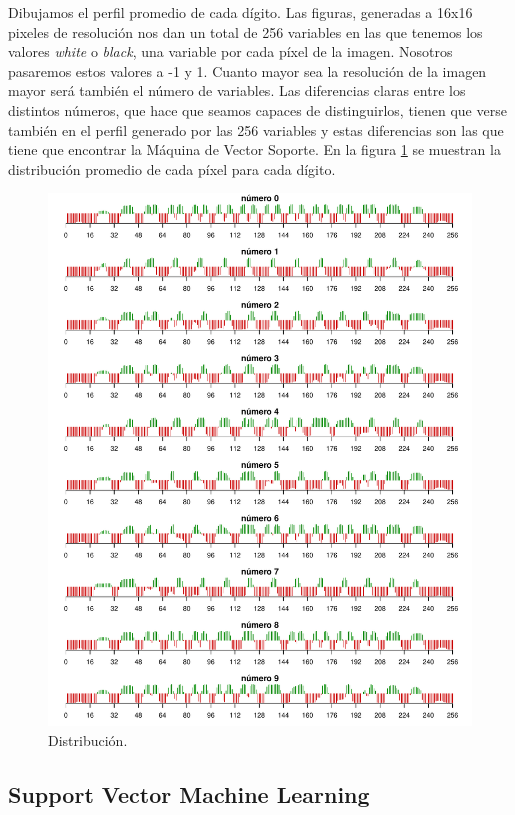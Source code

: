 \documentclass[12pt,spanish,a4paper]{article}
\numberwithin{equation}{section}
\begin{document}
Dibujamos el perfil promedio de cada dígito. Las figuras, generadas a
16x16 pixeles de resolución nos dan un total de 256 variables en las que
tenemos los valores \emph{white} o \emph{black}, una variable por cada
píxel de la imagen. Nosotros pasaremos estos valores a -1 y 1. Cuanto
mayor sea la resolución de la imagen mayor será también el número de
variables. Las diferencias claras entre los distintos números, que hace
que seamos capaces de distinguirlos, tienen que verse también en el
perfil generado por las 256 variables y estas diferencias son las que
tiene que encontrar la Máquina de Vector Soporte. En la figura
\ref{fig:perfiles_digitos} se muestran la distribución promedio de cada
píxel para cada dígito.

\begin{figure}[h]

{\centering \includegraphics[width=0.8\linewidth]{graphics/svm/perfiles_digitos-1} 

}

\caption{Distribución.}\label{fig:perfiles_digitos}
\end{figure}

\subsection{Support Vector Machine
Learning}\label{support-vector-machine-learning}
\end{document}
